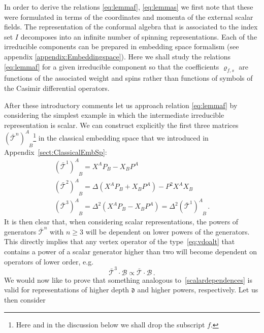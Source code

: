 \documentclass{article}
\def\dep{\mathfrak{d}}
\begin{document}
In order to derive the relations \eqref{eq:lemmaf}, \eqref{eq:lemmas} we first note that these 
were formulated in terms of the coordinates and momenta of the external scalar fields. The representation of the conformal algebra that is associated to the index set $I$ decomposes 
into an infinite number of spinning representations. Each of the irreducible components can 
be prepared in embedding space formalism (see appendix \ref{appendix:Embeddingspace}). Here we shall study the relations 
\eqref{eq:lemmaf} for a given irreducible component so that the coefficients $\varrho_{f,s}$ are 
functions of the associated weight and spins rather than functions of symbols of the Casimir 
differential operators. 

After these introductory comments let us approach relation \eqref{eq:lemmaf} by considering 
the simplest example in which the intermediate irreducible representation is scalar. We can  
construct explicitly the first three matrices $( \bar{\mathcal{T}}^{n})^{A}_{\;\;\,B}$\footnote{Here 
and in the discussion below we shall drop the subscript $f$.} in the classical embedding space that 
we introduced in Appendix~\ref{sect:ClassicalEmbSp}:
\begin{equation}
\begin{gathered}
    \left( \bar{\mathcal{T}}^1\right)^{A}_{\;\;\,B} = X^A P_B-X_B P^A\\
    \left( \bar{\mathcal{T}}^2\right)^{A}_{\;\;\,B} =\Delta\left(X^A P_B +X_B P^A\right)-P^2X^AX_B\\
    \left( \bar{\mathcal{T}}^3\right)^{A}_{\;\;\,B} =\Delta^2 \left( X^A P_B- X_B P^A\right)=\Delta^2  \left( \bar{\mathcal{T}}^1\right)^{A}_{\;\;\,B} \,.
    \label{scalardependences}
\end{gathered}
\end{equation}
It is then clear that, when considering scalar representations, the powers of generators $ \bar{\mathcal{T}}^n$ with $n\ge 3$ will be dependent on lower powers of the generators. This 
directly implies that any vertex operator of the type~\eqref{eq:vdoalt} that contains a power 
of a scalar generator higher than two will become dependent on operators of lower order, e.g.
\begin{equation}
     \bar{\mathcal{T}}^3\cdot \mathcal{B}\propto  \bar{\mathcal{T}} \cdot \mathcal{B}\,.
\end{equation}
We would now like to prove that something analogous to~\eqref{scalardependences} is valid for 
representations of higher depth $\dep$ and higher powers, respectively. Let us then consider 
\end{document}
